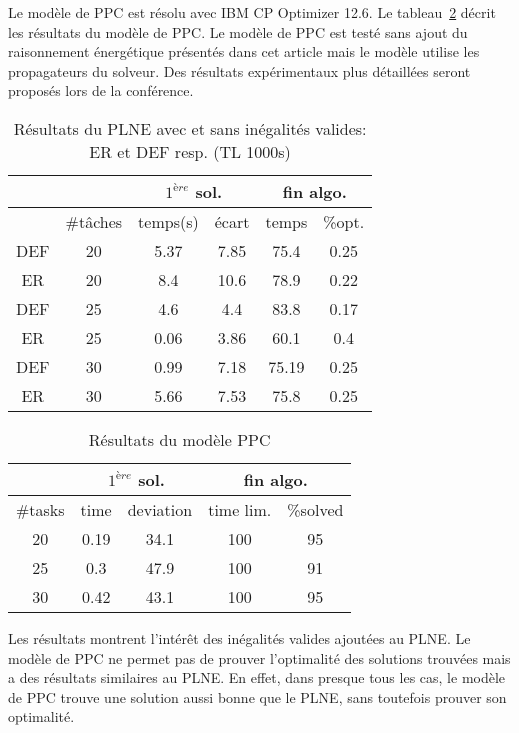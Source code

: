 Le modèle de PPC est résolu avec IBM CP Optimizer 12.6. Le
tableau~\ref{table2} décrit les résultats du modèle de PPC.  Le modèle 
de PPC est testé sans ajout du raisonnement énergétique présentés dans
cet article mais le modèle utilise les propagateurs du solveur. Des
résultats expérimentaux plus détaillées seront proposés lors de la
conférence.
\begin{table}
\centering
    \footnotesize
    \begin{tabular}{|c|c|cc|cc|}
      \hline
       & & \multicolumn{2}{c|}{$1^{ère}$ sol.} & \multicolumn{2}{c|}{fin algo.}\\
      \hline
    &  \#tâches & temps(s) &  écart & temps  & \%opt. \\
      \hline
      DEF	&	20	&	5.37	&	7.85	&	75.4	&	0.25\\
      ER	&	20	&	8.4	&	10.6	&	78.9	&	0.22\\
      \hline
      DEF	&	25	&	4.6	&	4.4	&	83.8	&	0.17\\
      ER	&	25	&	0.06	&	3.86	&	60.1	&	0.4\\
      \hline
      DEF	&	30	&	0.99	&	7.18	&	75.19	&	0.25\\
      ER	&	30	&	5.66	&	7.53	&	75.8	&	0.25\\
      \hline
    \end{tabular}
  \caption{Résultats du PLNE avec et sans inégalités valides: ER et
    DEF resp. (TL 1000s)}
  \label{table1}
\end{table}


\begin{table}
    \footnotesize
\centering
    \begin{tabular}{|c|cc|cc|}
      \hline
      & \multicolumn{2}{c|}{$1^{ère}$ sol.} & \multicolumn{2}{c|}{fin algo.}\\
      \hline
      \#tasks & time & deviation & time lim. &  \%solved \\
      \hline
20	&0.19&	34.1&	100&	95\\
25	&0.3	&47.9&	100	&91\\
30	&0.42	&43.1	&100	&95\\
      \hline
    \end{tabular}
  \caption{Résultats du modèle PPC}
\label{table2}
\end{table}

Les résultats montrent l'intérêt des inégalités valides ajoutées au
PLNE. Le modèle de PPC ne permet pas de prouver l'optimalité des solutions
trouvées mais a des résultats similaires au PLNE. En effet, dans
presque tous les cas, le modèle de PPC trouve une solution aussi bonne
que le PLNE, sans toutefois prouver son optimalité.

